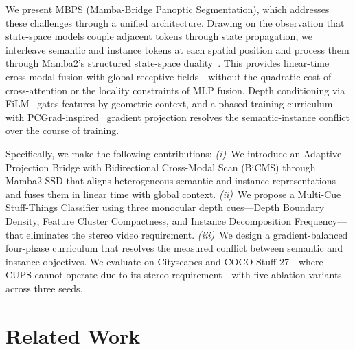 \documentclass[10pt,twocolumn,letterpaper]{article}
\begin{document}
We present MBPS (Mamba-Bridge Panoptic Segmentation), which addresses these challenges through a unified architecture. Drawing on the observation that state-space models couple adjacent tokens through state propagation, we interleave semantic and instance tokens at each spatial position and process them through Mamba2's structured state-space duality~\cite{dao2024mamba2}. This provides linear-time cross-modal fusion with global receptive fields---without the quadratic cost of cross-attention or the locality constraints of MLP fusion. Depth conditioning via FiLM~\cite{perez2018film} gates features by geometric context, and a phased training curriculum with PCGrad-inspired~\cite{yu2020pcgrad} gradient projection resolves the semantic-instance conflict over the course of training.

Specifically, we make the following contributions: \emph{(i)}~We introduce an Adaptive Projection Bridge with Bidirectional Cross-Modal Scan (BiCMS) through Mamba2 SSD that aligns heterogeneous semantic and instance representations and fuses them in linear time with global context. \emph{(ii)}~We propose a Multi-Cue Stuff-Things Classifier using three monocular depth cues---Depth Boundary Density, Feature Cluster Compactness, and Instance Decomposition Frequency---that eliminates the stereo video requirement. \emph{(iii)}~We design a gradient-balanced four-phase curriculum that resolves the measured conflict between semantic and instance objectives. We evaluate on Cityscapes and COCO-Stuff-27---where CUPS cannot operate due to its stereo requirement---with five ablation variants across three seeds.


\section{Related Work}
\label{sec:related}
\end{document}
